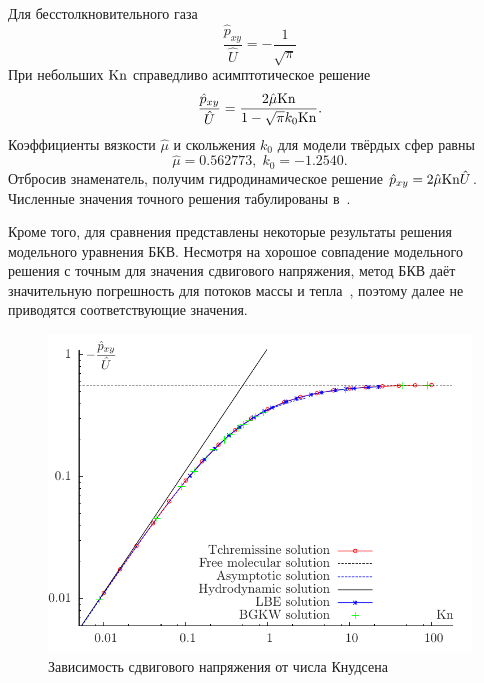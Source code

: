 Для бесстолкновительного газа
\[ \frac{\hat{p}_{xy}}{\hat{U}} = -\frac1{\sqrt{\pi}} \]
При небольших \(\mathrm{Kn}\) справедливо асимптотическое решение
\[ \frac{\hat{p}_{xy}}{\hat{U}} = \frac{2\hat{\mu}\mathrm{Kn}}{1-\sqrt{\pi}k_0\mathrm{Kn}}. \]
Коэффициенты вязкости \(\hat{\mu}\) и скольжения \(k_0\) для модели твёрдых сфер равны~\cite{Sone2007}
\[ \hat{\mu} = 0.562773, \; k_0 = -1.2540. \]
Отбросив знаменатель, получим гидродинамическое решение \(\hat{p}_{xy} = 2\hat{\mu}\mathrm{Kn}\hat{U}\).
Численные значения точного решения табулированы в~\cite{Sone1990}.

Кроме того, для сравнения представлены некоторые результаты решения модельного уравнения БКВ.
Несмотря на хорошое совпадение модельного решения с точным для значения сдвигового напряжения,
метод БКВ даёт значительную погрешность для потоков массы и тепла~\cite{Sone1990},
поэтому далее не приводятся соответствующие значения.

\begin{figure}
	\centering
	\includegraphics{problems/couette_stress.pdf}
	\caption{Зависимость сдвигового напряжения от числа Кнудсена}\label{fig:couette:shear}
\end{figure}

